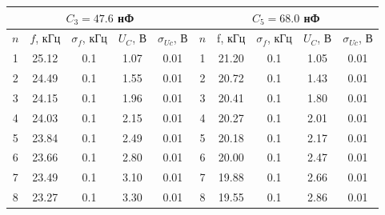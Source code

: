 \documentclass[a4paper,12pt]{article} %
\begin{document}
\begin{center}
	\begin{tabular}{ccccc||c|c|c|c|c|}
		\hline
		\multicolumn{5}{|c||}{$C_3 = 47.6$ нФ}                                                                                                         & \multicolumn{5}{c|}{$C_5 = 68.0$ нФ}        \\ \hline
		\multicolumn{1}{|c|}{$n$} & \multicolumn{1}{c|}{$f$, кГц} & \multicolumn{1}{c|}{$\sigma_f$, кГц} & \multicolumn{1}{c|}{$U_{C}$, В} & $\sigma_{Uc}$, В         & $n$ & f, кГц & $\sigma_f$, кГц & $U_{C}$, В & $\sigma_{Uc}$, В \\ \hline
        \multicolumn{1}{|c|}{1}   & \multicolumn{1}{c|}{25.12}     & \multicolumn{1}{c|}{0.1}             & \multicolumn{1}{c|}{1.07}   & 0.01                  & 1   & 21.20   & 0.1             & 1.05 & 0.01          \\ \hline
        \multicolumn{1}{|c|}{2}   & \multicolumn{1}{c|}{24.49}     & \multicolumn{1}{c|}{0.1}             & \multicolumn{1}{c|}{1.55}   & 0.01                  & 2   & 20.72   & 0.1             & 1.43 & 0.01          \\ \hline
        \multicolumn{1}{|c|}{3}   & \multicolumn{1}{c|}{24.15}     & \multicolumn{1}{c|}{0.1}             & \multicolumn{1}{c|}{1.96}   & 0.01                  & 3   & 20.41   & 0.1             & 1.80 & 0.01          \\ \hline
        \multicolumn{1}{|c|}{4}   & \multicolumn{1}{c|}{24.03}       & \multicolumn{1}{c|}{0.1}             & \multicolumn{1}{c|}{2.15}   & 0.01                  & 4   & 20.27     & 0.1             & 2.01 & 0.01          \\ \hline
        \multicolumn{1}{|c|}{5}   & \multicolumn{1}{c|}{23.84}     & \multicolumn{1}{c|}{0.1}             & \multicolumn{1}{c|}{2.49}   & 0.01                  & 5   & 20.18   & 0.1             & 2.17 & 0.01          \\ \hline
        \multicolumn{1}{|c|}{6}   & \multicolumn{1}{c|}{23.66}       & \multicolumn{1}{c|}{0.1}             & \multicolumn{1}{c|}{2.80}   & 0.01                  & 6   & 20.00   & 0.1             & 2.47 & 0.01          \\ \hline
        \multicolumn{1}{|c|}{7}   & \multicolumn{1}{c|}{23.49}     & \multicolumn{1}{c|}{0.1}             & \multicolumn{1}{c|}{3.10}   & 0.01                  & 7   & 19.88   & 0.1             & 2.66 & 0.01          \\ \hline
		\multicolumn{1}{|c|}{8}   & \multicolumn{1}{c|}{23.27}     & \multicolumn{1}{c|}{0.1}             & \multicolumn{1}{c|}{3.30}   & 0.01                  & 8   & 19.55     & 0.1             & 2.86 & 0.01          \\ \hline

\end{tabular}
\end{center}
\end{document}
